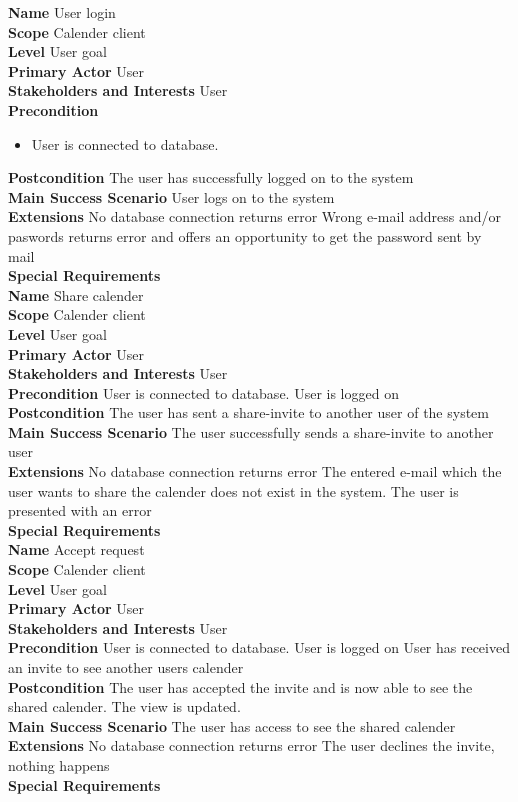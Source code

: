 \documentclass[a4paper,10pt,titlepage]{article}
\begin{document}
	\textbf{Name}
	User login
	\\
	\textbf{Scope}
	Calender client
	\\
	\textbf{Level}
	User goal
	\\
	\textbf{Primary Actor}
	User
	\\
	\textbf{Stakeholders and Interests}
	User
	\\
	\textbf{Precondition}
				\begin{itemize}
				\item User is connected to database.
				\end{itemize}
	\textbf{Postcondition}
	The user has successfully logged on to the system
	\\
	\textbf{Main Success Scenario}
	User logs on to the system
	\\
	\textbf{Extensions}
	No database connection returns error
	Wrong e-mail address and/or paswords returns error and offers an opportunity to get the password sent by mail
	\\
	\textbf{Special Requirements}
	\\
	
	\textbf{Name}
	Share calender
	\\
	\textbf{Scope}
	Calender client
	\\
	\textbf{Level}
	User goal
	\\
	\textbf{Primary Actor}
	User
	\\
	\textbf{Stakeholders and Interests}
	User
	\\
	\textbf{Precondition}
	User is connected to database.
	User is logged on
	\\
	\textbf{Postcondition}
	The user has sent a share-invite to another user of the system
	\\
	\textbf{Main Success Scenario}
	The user successfully sends a share-invite to another user
	\\
	\textbf{Extensions}
	No database connection returns error
	The entered e-mail which the user wants to share the calender does not exist in the system. The user is presented with an error
	\\
	\textbf{Special Requirements}
	\\
	
	\textbf{Name}
	Accept request
	\\
	\textbf{Scope}
	Calender client
	\\
	\textbf{Level}
	User goal
	\\
	\textbf{Primary Actor}
	User
	\\
	\textbf{Stakeholders and Interests}
	User
	\\
	\textbf{Precondition}
	User is connected to database.
	User is logged on
	User has received an invite to see another users calender
	\\
	\textbf{Postcondition}
	The user has accepted the invite and is now able to see the shared calender. The view is updated.
	\\
	\textbf{Main Success Scenario}
	The user has access to see the shared calender
	\\
	\textbf{Extensions}
	No database connection returns error
	The user declines the invite, nothing happens
	\\
	\textbf{Special Requirements}
	
\end{document}
